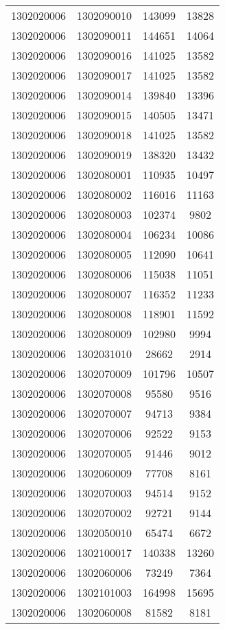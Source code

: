 \begin{longtable}[h]{llcc}
		1302020006 & 1302090010 & 143099 & 13828\\
		1302020006 & 1302090011 & 144651 & 14064\\
		1302020006 & 1302090016 & 141025 & 13582\\
		1302020006 & 1302090017 & 141025 & 13582\\
		1302020006 & 1302090014 & 139840 & 13396\\
		1302020006 & 1302090015 & 140505 & 13471\\
		1302020006 & 1302090018 & 141025 & 13582\\
		1302020006 & 1302090019 & 138320 & 13432\\
		1302020006 & 1302080001 & 110935 & 10497\\
		1302020006 & 1302080002 & 116016 & 11163\\
		1302020006 & 1302080003 & 102374 & 9802\\
		1302020006 & 1302080004 & 106234 & 10086\\
		1302020006 & 1302080005 & 112090 & 10641\\
		1302020006 & 1302080006 & 115038 & 11051\\
		1302020006 & 1302080007 & 116352 & 11233\\
		1302020006 & 1302080008 & 118901 & 11592\\
		1302020006 & 1302080009 & 102980 & 9994\\
		1302020006 & 1302031010 & 28662 & 2914\\
		1302020006 & 1302070009 & 101796 & 10507\\
		1302020006 & 1302070008 & 95580 & 9516\\
		1302020006 & 1302070007 & 94713 & 9384\\
		1302020006 & 1302070006 & 92522 & 9153\\
		1302020006 & 1302070005 & 91446 & 9012\\
		1302020006 & 1302060009 & 77708 & 8161\\
		1302020006 & 1302070003 & 94514 & 9152\\
		1302020006 & 1302070002 & 92721 & 9144\\
		1302020006 & 1302050010 & 65474 & 6672\\
		1302020006 & 1302100017 & 140338 & 13260\\
		1302020006 & 1302060006 & 73249 & 7364\\
		1302020006 & 1302101003 & 164998 & 15695\\
		1302020006 & 1302060008 & 81582 & 8181\\

\end{longtable}
